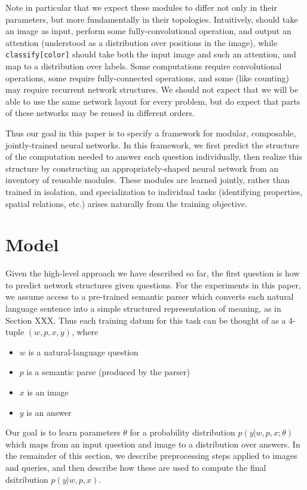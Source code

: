 \documentclass[10pt,twocolumn,letterpaper]{article}
\begin{document}
Note in particular that we expect these modules to differ not only in their
parameters, but more fundamentally in their topologies. Intuitively, 
should take an image as input, perform some fully-convolutional operation, and
output an attention (understood as a distribution over positions in the image),
while {\small\tt classify[color]} should take both the input image and such an attention, and map to a
distribution over labels. Some computations require convolutional operations, some require fully-connected operations, and some (like counting) may require recurrent network structures. We should not expect that we will be able to use the same network layout for every problem, but do expect that parts of these networks may be reused in different orders.

Thus our goal in this paper is to specify a framework for modular, composable, jointly-trained neural networks. In this framework, we first predict the structure of the computation needed to answer each question individually, then realize this structure by constructing an appropriately-shaped neural network from an inventory of reusable modules. These modules are learned jointly, rather than trained in isolation, and specialization to individual tasks (identifying properties, spatial relations, etc.) arises naturally from the training objective.



\section{Model}

Given the high-level approach we have described so far, the first question is how to
predict network structures given questions.
For the experiments in this paper, we assume access to a pre-trained semantic parser
which converts each natural language sentence into a simple structured
representation of meaning, as in Section XXX. Thus each training datum for this
task can be thought of as a 4-tuple $(w, p, x, y)$, where
\begin{itemize}
  \item $w$ is a natural-language question
  \item $p$ is a semantic parse (produced by the parser)
  \item $x$ is an image
  \item $y$ is an answer
\end{itemize}
Our goal is to learn parameters $\theta$ for a probability distribution $p(y |
w, p, x; \theta)$
which maps from an input question and image to a distribution over answers. In
the remainder of this section, we describe preprocessing steps applied to images
and queries, and then describe how these are used to compute the final
dsitribution $p(y | w, p, x)$.
\end{document}
